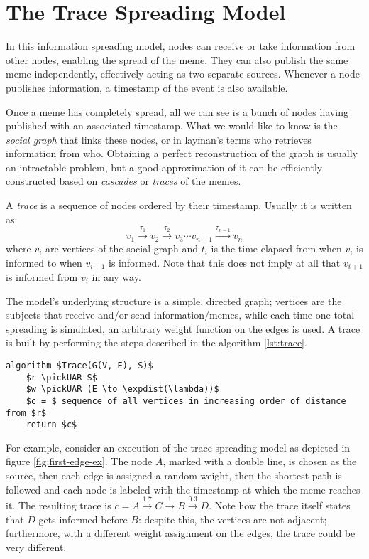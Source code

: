 \section{The Trace Spreading Model}

In this information spreading model, nodes can receive or take information from other nodes, enabling the spread of the meme. They can also publish the same meme independently, effectively acting as two separate sources. Whenever a node publishes information, a timestamp of the event is also available.

Once a meme has completely spread, all we can see is a bunch of nodes having published with an associated timestamp. What we would like to know is the \emph{social graph} that links these nodes, or in layman's terms who retrieves information from who. Obtaining a perfect reconstruction of the graph is usually an intractable problem, but a good approximation of it can be efficiently constructed based on \textit{cascades} or \textit{traces} of the memes.

\begin{definition}
    A \emph{trace} is a sequence of nodes ordered by their timestamp. Usually it is written as:
    \[
        v_1 \stackrel{\tau_1}{\longrightarrow} v_2 \stackrel{\tau_2}{\longrightarrow} v_3 \cdots v_{n - 1} \stackrel{\tau_{n - 1}}{\longrightarrow} v_n
    \]
    where $v_i$ are vertices of the social graph and $t_i$ is the time elapsed from when $v_i$ is informed to when $v_{i + 1}$ is informed. Note that this does not imply at all that $v_{i + 1}$ is informed from $v_i$ in any way.
\end{definition}

The model's underlying structure is a simple, directed graph; vertices are the subjects that receive and/or send information/memes, while  each time one total spreading is simulated, an arbitrary weight function on the edges is used. A trace is built by performing the steps described in the algorithm \ref{lst:trace}.

\begin{lstlisting}[caption = {Algorithm for building a trace}, label = {lst:trace}]
algorithm $Trace(G(V, E), S)$
    $r \pickUAR S$
    $w \pickUAR (E \to \expdist(\lambda))$
    $c = $ sequence of all vertices in increasing order of distance from $r$
    return $c$
\end{lstlisting}

For example, consider an execution of the trace spreading model as depicted in figure \ref{fig:first-edge-ex}. The node $A$, marked with a double line, is chosen as the source, then each edge is assigned a random weight, then the shortest path is followed and each node is labeled with the timestamp at which the meme reaches it. The resulting trace is $c = A \stackrel{1.7}{\longrightarrow} C \stackrel{1}{\longrightarrow} B \stackrel{0.3}{\longrightarrow} D$. Note how the trace itself states that $D$ gets informed before $B$: despite this, the vertices are not adjacent; furthermore, with a different weight assignment on the edges, the trace could be very different.

